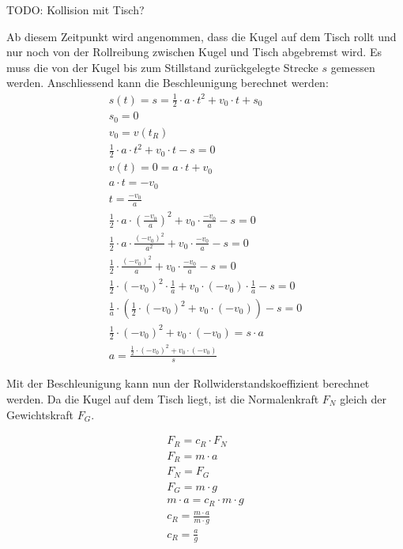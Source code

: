 TODO: Kollision mit Tisch?

Ab diesem Zeitpunkt wird angenommen, dass die Kugel auf dem Tisch rollt und nur noch von der Rollreibung zwischen Kugel und Tisch abgebremst wird.
Es muss die von der Kugel bis zum Stillstand zurückgelegte Strecke $s$ gemessen werden.
Anschliessend kann die Beschleunigung berechnet werden:
\begin{align}
    s(t) = s = \frac{1}{2} \cdot a \cdot t^2 + v_0 \cdot t + s_0\\
    s_0 = 0\\
    v_0 = v(t_R)\\
    \frac{1}{2} \cdot a \cdot t^2 + v_0 \cdot t - s = 0\\
    v(t) = 0 = a \cdot t + v_0\\
    a \cdot t = -v_0\\
    t = \frac{-v_0}{a}\\
    \frac{1}{2} \cdot a \cdot (\frac{-v_0}{a})^2 + v_0 \cdot \frac{-v_0}{a} - s = 0\\
    \frac{1}{2} \cdot a \cdot \frac{(-v_0)^2}{a^2} + v_0 \cdot \frac{-v_0}{a} - s = 0\\
    \frac{1}{2} \cdot \frac{(-v_0)^2}{a} + v_0 \cdot \frac{-v_0}{a} - s = 0\\
    \frac{1}{2} \cdot (-v_0)^2 \cdot \frac{1}{a} + v_0 \cdot (-v_0) \cdot \frac{1}{a} - s = 0\\
    \frac{1}{a} \cdot (\frac{1}{2} \cdot (-v_0)^2 + v_0 \cdot (-v_0)) - s = 0\\
    \frac{1}{2} \cdot (-v_0)^2 + v_0 \cdot (-v_0) = s \cdot a\\
    a = \frac{\frac{1}{2} \cdot (-v_0)^2 + v_0 \cdot (-v_0)}{s}
\end{align}

Mit der Beschleunigung kann nun der Rollwiderstandskoeffizient berechnet werden.
Da die Kugel auf dem Tisch liegt, ist die Normalenkraft $F_N$ gleich der Gewichtskraft $F_G$.

\begin{align}
    F_R = c_R \cdot F_N\\
    F_R = m \cdot a\\
    F_N = F_G\\
    F_G = m \cdot g\\
    m \cdot a = c_R \cdot m \cdot g\\
    c_R = \frac{m \cdot a}{m \cdot g}\\
    c_R = \frac{a}{g}
\end{align}

